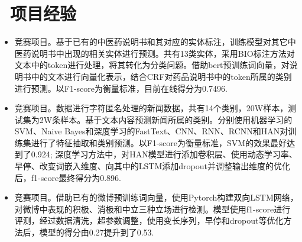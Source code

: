 \documentclass[10pt]{resume}
\begin{document}
\section{\faCogs\ 项目经验}\normalsize
\begin{itemize}
\item{竞赛项目。基于已有的中医药说明书和其对应的实体标注，训练模型对其它中医药说明书中出现的相关实体进行预测。共有13类实体，采用BIO标注方法对文本中的token进行处理，将其转化为分类问题。借助bert预训练词向量，对说明书中的文本进行向量化表示，结合CRF对药品说明书中的token所属的类别进行预测。以F1-score为衡量标准，目前在线得分为0.7496.}
\end{itemize}
\begin{itemize}
\item{竞赛项目。数据进行字符匿名处理的新闻数据，共有14个类别，20W样本，测试集为2W条样本。基于文本内容预测新闻所属的类别。分别使用机器学习的SVM、Naive Bayes和深度学习的FastText、CNN、RNN、RCNN和HAN对训练集进行了特征抽取和类别预测。以F1-score为衡量标准，SVM的效果最好达到了0.924; 深度学习方法中，对HAN模型进行添加卷积层、使用动态学习率、早停、改变词嵌入维度、向其中的LSTM添加dropout并调整输出维度的优化后，f1-score最终得分为0.896.}
\end{itemize}
 \begin{itemize}
 \item {竞赛项目。借助已有的微博预训练词向量，使用Pytorch构建双向LSTM网络，对微博中表现的积极、消极和中立三种立场进行检测。模型使用f1-score进行评测，经过数据清洗，超参数调整，使用变长序列，早停和dropout等优化方法后，模型的得分由0.27提升到了0.53.}
 \end{itemize}
\end{document}
